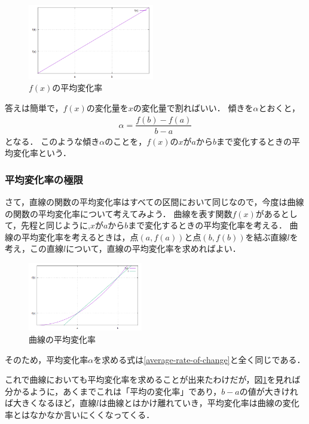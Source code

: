 \begin{figure}[h]
	\centering
	\includegraphics[width=5.5cm]{img/average-rate-of-change.png}
    \caption{$f(x)$の平均変化率}
\end{figure}

答えは簡単で，$f(x)$の変化量を$x$の変化量で割ればいい．
傾きを$\alpha $とおくと，
\begin{align}
	\alpha = \dfrac{f(b)-f(a)}{b-a}
    \label{average-rate-of-change}
\end{align}
となる．
このような傾き$\alpha$のことを，$f(x)$の$x$が$a$から$b$まで変化するときの平均変化率という．

\subsubsection{平均変化率の極限}
さて，直線の関数の平均変化率はすべての区間において同じなので，今度は曲線の関数の平均変化率について考えてみよう．
曲線を表す関数$f(x)$があるとして，先程と同じように,$x$が$a$から$b$まで変化するときの平均変化率を考える．
曲線の平均変化率を考えるときは，点$(a,f(a))$と点$(b,f(b))$を結ぶ直線$l$を考え，この直線$l$について，直線の平均変化率を求めればよい．
\begin{figure}[htbp]
	\centering
	\includegraphics[width=5cm]{img/curve-average-rate-of-change.png}
    \caption{曲線の平均変化率}
    \label{curve-average-rate-of-change}

\end{figure}
そのため，平均変化率$\alpha$を求める式は\ref{average-rate-of-change}と全く同じである．

これで曲線においても平均変化率を求めることが出来たわけだが，図\ref{curve-average-rate-of-change}を見れば分かるように，あくまでこれは「平均の変化率」であり，$b-a$の値が大きければ大きくなるほど，直線$l$は曲線とはかけ離れていき，平均変化率は曲線の変化率とはなかなか言いにくくなってくる．

